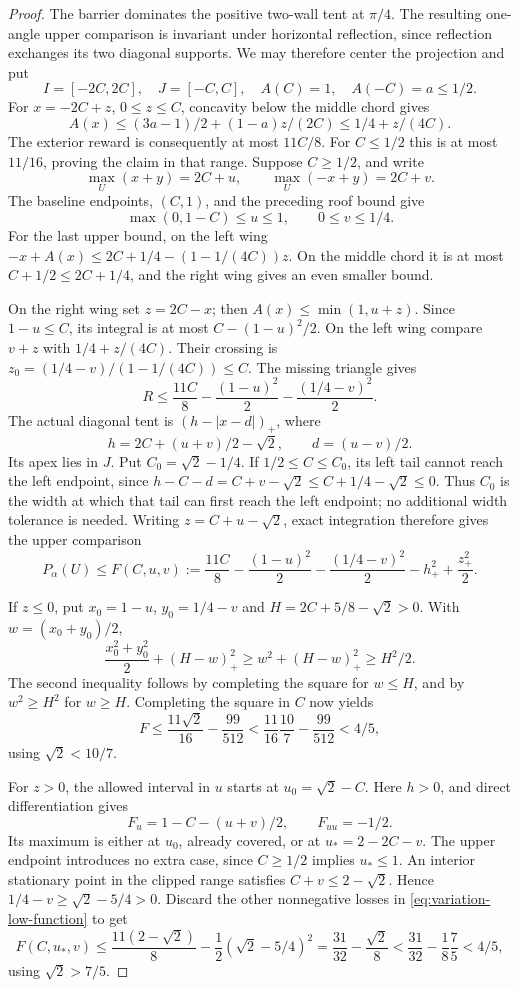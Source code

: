 \begin{proof}
The barrier dominates the positive two-wall tent at $\pi/4$.
The resulting one-angle upper comparison is invariant under
horizontal reflection, since reflection exchanges its two diagonal
supports. We may therefore center the projection and put
\[
 I=[-2C,2C],\quad J=[-C,C],\quad A(C)=1,\quad A(-C)=a\le1/2.
\]
For $x=-2C+z$, $0\le z\le C$, concavity below the middle chord gives
\[
 A(x)\le(3a-1)/2+(1-a)z/(2C)\le1/4+z/(4C).
\]
The exterior reward is consequently at most $11C/8$.
For $C\le1/2$ this is at most $11/16$, proving the claim in
that range. Suppose $C\ge1/2$, and write
\[
 \max_U(x+y)=2C+u,\qquad\max_U(-x+y)=2C+v.
\]
The baseline endpoints, $(C,1)$, and the preceding roof bound give
\[
 \max(0,1-C)\le u\le1,\qquad0\le v\le1/4.
\]
For the last upper bound, on the left wing
$-x+A(x)\le2C+1/4-(1-1/(4C))z$.
On the middle chord it is at most $C+1/2\le2C+1/4$,
and the right wing gives an even smaller bound.

On the right wing set $z=2C-x$; then
$A(x)\le\min(1,u+z)$. Since $1-u\le C$, its integral is at most
$C-(1-u)^2/2$. On the left wing compare $v+z$ with
$1/4+z/(4C)$. Their crossing is
$z_0=(1/4-v)/(1-1/(4C))\le C$. The missing triangle gives
\[
 R\le\frac{11C}{8}-\frac{(1-u)^2}{2}-\frac{(1/4-v)^2}{2}.
\]
The actual diagonal tent is $(h-|x-d|)_+$, where
\[
 h=2C+(u+v)/2-\sqrt2,\qquad d=(u-v)/2.
\]
Its apex lies in $J$. Put $C_0=\sqrt2-1/4$. If $1/2\le C\le C_0$, its left tail
cannot reach the left endpoint, since
$h-C-d=C+v-\sqrt2\le C+1/4-\sqrt2\le0$.
Thus $C_0$ is the width at which that tail can first reach the left
endpoint; no additional width tolerance is needed.
Writing $z=C+u-\sqrt2$, exact integration therefore gives the
upper comparison
\begin{equation}\label{eq:variation-low-function}
 P_\alpha(U)\le F(C,u,v):=\frac{11C}{8}
  -\frac{(1-u)^2}{2}-\frac{(1/4-v)^2}{2}-h_+^2+\frac{z_+^2}{2}.
\end{equation}

If $z\le0$, put $x_0=1-u$, $y_0=1/4-v$ and
$H=2C+5/8-\sqrt2>0$. With $w=(x_0+y_0)/2$,
\[
 \frac{x_0^2+y_0^2}{2}+(H-w)_+^2
 \ge w^2+(H-w)_+^2\ge H^2/2.
\]
The second inequality follows by completing the square for $w\le H$,
and by $w^2\ge H^2$ for $w\ge H$.
Completing the square in $C$ now yields
\[
 F\le\frac{11\sqrt2}{16}-\frac{99}{512}
   <\frac{11}{16}\frac{10}{7}-\frac{99}{512}<4/5,
\]
using $\sqrt2<10/7$.

For $z>0$, the allowed interval in $u$ starts at $u_0=\sqrt2-C$.
Here $h>0$, and direct differentiation gives
\[
 F_u=1-C-(u+v)/2,\qquad F_{uu}=-1/2.
\]
Its maximum is either at $u_0$, already covered, or at
$u_*=2-2C-v$. The upper endpoint introduces no extra case,
since $C\ge1/2$ implies $u_*\le1$.
An interior stationary point in the clipped range satisfies
$C+v\le2-\sqrt2$. Hence
$1/4-v\ge\sqrt2-5/4>0$.
Discard the other nonnegative losses in
\eqref{eq:variation-low-function} to get
\[
 F(C,u_*,v)\le\frac{11(2-\sqrt2)}8
                     -\frac12(\sqrt2-5/4)^2
  =\frac{31}{32}-\frac{\sqrt2}{8}
  <\frac{31}{32}-\frac18\frac75<4/5,
\]
using $\sqrt2>7/5$.


\end{proof}
